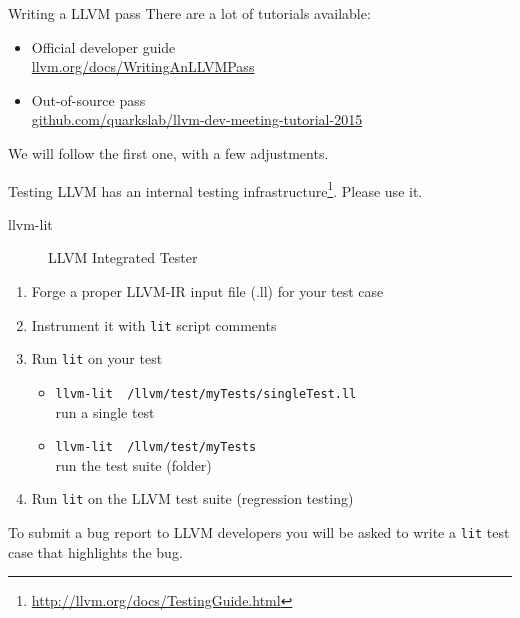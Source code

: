 \begin{frame}{Writing a LLVM pass}
	There are a lot of tutorials available:
	\vfill
	\begin{itemize}
		\item Official developer guide\\ \href{http://llvm.org/docs/WritingAnLLVMPass.html}{\url{llvm.org/docs/WritingAnLLVMPass}}
		\vfill
		\item Out-of-source pass\\ \href{https://github.com/quarkslab/llvm-dev-meeting-tutorial-2015}{\url{github.com/quarkslab/llvm-dev-meeting-tutorial-2015}}
	\end{itemize}
	\vfill
	We will follow the first one, with a few adjustments.
\end{frame}


\begin{frame}{Testing}
LLVM has an internal testing infrastructure\footnote{\url{http://llvm.org/docs/TestingGuide.html}}.
Please use it.
\\
\begin{description}
	\item[llvm-lit] LLVM Integrated Tester
\end{description}
\begin{enumerate}
	\item Forge a proper LLVM-IR input file (.ll) for your test case
	\item Instrument it with \texttt{lit} script comments
	\item Run \texttt{lit} on your test
		\begin{itemize}
			\item \texttt{llvm-lit ~/llvm/test/myTests/singleTest.ll}\\ run a single test
			\item \texttt{llvm-lit ~/llvm/test/myTests}\\ run the test suite (folder)
		\end{itemize}
	\item Run \texttt{lit} on the LLVM test suite (regression testing)
\end{enumerate}
\vfill
To submit a bug report to LLVM developers you will be asked to write a \texttt{lit} test case that highlights the bug.
\end{frame}
